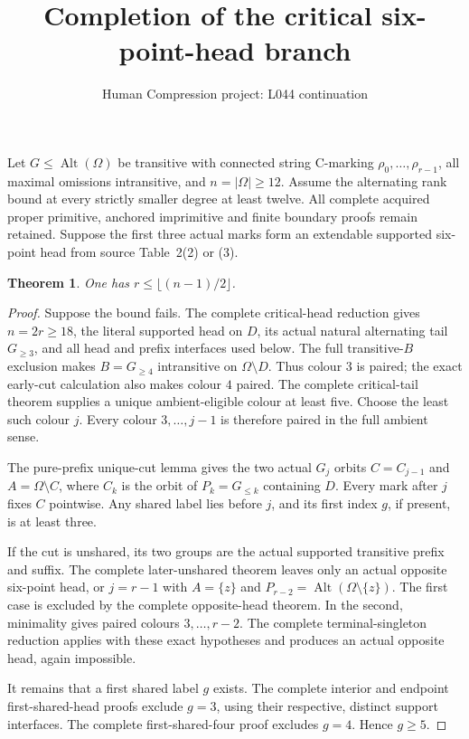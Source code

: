 \documentclass[11pt,a4paper]{article}
\title{Completion of the critical six-point-head branch}
\author{Human Compression project: L044 continuation}
\date{}
\newtheorem{theorem}{Theorem}
\begin{document}
\maketitle
Let $G\le\operatorname{Alt}(\Omega)$ be transitive with connected
string C-marking $\rho_0,\ldots,\rho_{r-1}$, all maximal omissions
intransitive, and $n=|\Omega|\ge12$. Assume the alternating rank
bound at every strictly smaller degree at least twelve. All complete
acquired proper primitive, anchored imprimitive and finite boundary
proofs remain retained. Suppose the first three actual marks form
an extendable supported six-point head from source Table~2(2) or (3).

\begin{theorem}
One has $r\le\lfloor(n-1)/2\rfloor$.
\end{theorem}
\begin{proof}
Suppose the bound fails. The complete critical-head reduction
gives $n=2r\ge18$, the literal supported head on $D$, its
actual natural alternating tail $G_{\ge3}$, and all head
and prefix interfaces used below. The full transitive-$B$
exclusion makes $B=G_{\ge4}$ intransitive on $\Omega\setminus D$.
Thus colour $3$ is paired; the exact early-cut calculation
also makes colour $4$ paired. The complete critical-tail
theorem supplies a unique ambient-eligible colour at least five.
Choose the least such colour $j$. Every colour $3,\ldots,j-1$
is therefore paired in the full ambient sense.

The pure-prefix unique-cut lemma gives the two actual $G_j$
orbits $C=C_{j-1}$ and $A=\Omega\setminus C$, where $C_k$
is the orbit of $P_k=G_{\le k}$ containing $D$. Every mark
after $j$ fixes $C$ pointwise. Any shared label lies before
$j$, and its first index $g$, if present, is at least three.

If the cut is unshared, its two groups are the actual supported
transitive prefix and suffix. The complete later-unshared theorem
leaves only an actual opposite six-point head, or $j=r-1$
with $A=\{z\}$ and $P_{r-2}=\operatorname{Alt}(\Omega\setminus\{z\})$.
The first case is excluded by the complete opposite-head theorem.
In the second, minimality gives paired colours $3,\ldots,r-2$.
The complete terminal-singleton reduction applies with these exact
hypotheses and produces an actual opposite head, again impossible.

It remains that a first shared label $g$ exists.
The complete interior and endpoint first-shared-head proofs
exclude $g=3$, using their respective, distinct support interfaces.
The complete first-shared-four proof excludes $g=4$.
Hence $g\ge5$.


\end{proof}
\end{document}

